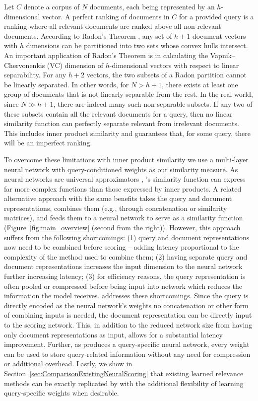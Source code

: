 \documentclass[sigconf,]{acmart}
\begin{document}
Let $C$ denote a corpus of $N$ documents, each being represented by an $h$-dimensional vector. A perfect ranking of documents in $C$ for a provided query is a ranking where all relevant documents are ranked above all non-relevant documents. According to Radon's Theorem \cite{RadonTheorem}, any set of $h+1$ document vectors with $h$ dimensions can be partitioned into two sets whose convex hulls intersect. An important application of Radon's Theorem is in calculating the Vapnik–Chervonenkis (VC) dimension \cite{VCDim} of $h$-dimensional vectors with respect to linear separability. For any $h+2$ vectors, the two subsets of a Radon partition cannot be linearly separated. In other words, for $N>h+1$, there exists at least one group of documents that is not linearly separable from the rest. In the real world, since $N \gg h+1$, there are indeed many such non-separable subsets. If any two of these subsets contain all the relevant documents for a query, then no linear similarity function can perfectly separate relevant from irrelevant documents. This includes inner product similarity and guarantees that, for some query, there will be an imperfect ranking.

To overcome these limitations with inner product similarity we use a multi-layer neural network with query-conditioned weights as our similarity measure. As neural networks are universal approximators \cite{UniversalApproximators}, \name{}'s similarity function can express far more complex functions than those expressed by inner products. A related alternative approach with the same benefits takes the query and document representations, combines them (e.g., through concatenation or similarity matrices), and feeds them to a neural network to serve as a similarity function (Figure~\ref{fig:main_overview} (second from the right)). However, this approach suffers from the following shortcomings: (1) query and document representations now need to be combined before scoring -- adding latency proportional to the complexity of the method used to combine them; (2) having separate query and document representations increases the input dimension to the neural network further increasing latency; (3) for efficiency reasons, the query representation is often pooled or compressed before being input into network which reduces the information the model receives. \name{} addresses these shortcomings. Since the query is directly encoded as the neural network's weights no concatenation or other form of combining inputs is needed, the document representation can be directly input to the scoring network. This, in addition to the reduced network size from having only document representations as input, allows for a substantial latency improvement. Further, as \name{} produces a query-specific neural network, every weight can be used to store query-related information without any need for compression or additional overhead. Lastly, we show in Section~\ref{sec:ComparisonExistingNeuralScoring} that existing learned relevance methods can be exactly replicated by \name{} with the additional flexibility of learning query-specific weights when desirable.
\end{document}
